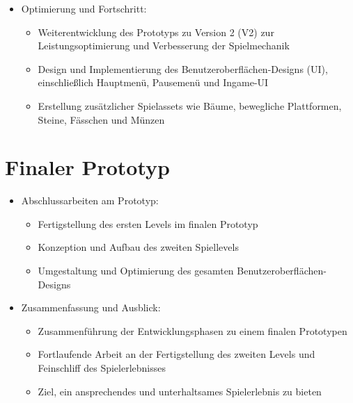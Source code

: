 \begin{itemize}
  \item Optimierung und Fortschritt:
    \begin{itemize}
      \item Weiterentwicklung des Prototyps zu Version 2 (V2) zur Leistungsoptimierung und Verbesserung der Spielmechanik
      \item Design und Implementierung des Benutzeroberflächen-Designs (UI), einschließlich Hauptmenü, Pausemenü und Ingame-UI
      \item Erstellung zusätzlicher Spielassets wie Bäume, bewegliche Plattformen, Steine, Fässchen und Münzen
    \end{itemize}
\end{itemize}

\pagebreak

\section{Finaler Prototyp}

\begin{itemize}
  \item Abschlussarbeiten am Prototyp:
    \begin{itemize}
      \item Fertigstellung des ersten Levels im finalen Prototyp
      \item Konzeption und Aufbau des zweiten Spiellevels
      \item Umgestaltung und Optimierung des gesamten Benutzeroberflächen-Designs
    \end{itemize}
    
  \item Zusammenfassung und Ausblick:
    \begin{itemize}
      \item Zusammenführung der Entwicklungsphasen zu einem finalen Prototypen
      \item Fortlaufende Arbeit an der Fertigstellung des zweiten Levels und Feinschliff des Spielerlebnisses
      \item Ziel, ein ansprechendes und unterhaltsames Spielerlebnis zu bieten
    \end{itemize}
\end{itemize}



\pagebreak

